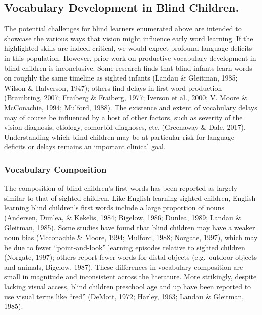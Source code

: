 \documentclass[
  man,floatsintext]{apa6}
\begin{document}
\hypertarget{vocabulary-development-in-blind-children.}{%
\subsection{Vocabulary Development in Blind Children.}\label{vocabulary-development-in-blind-children.}}

The potential challenges for blind learners enumerated above are intended to showcase the various ways that vision might influence early word learning. If the highlighted skills are indeed critical, we would expect profound language deficits in this population. However, prior work on productive vocabulary development in blind children is inconclusive. Some research finds that blind infants learn words on roughly the same timeline as sighted infants (Landau \& Gleitman, 1985; Wilson \& Halverson, 1947); others find delays in first-word production (Brambring, 2007; Fraiberg \& Fraiberg, 1977; Iverson et al., 2000; V. Moore \& McConachie, 1994; Mulford, 1988). The existence and extent of vocabulary delays may of course be influenced by a host of other factors, such as severity of the vision diagnosis, etiology, comorbid diagnoses, etc. (Greenaway \& Dale, 2017). Understanding which blind children may be at particular risk for language deficits or delays remains an important clinical goal.

\hypertarget{vocabulary-composition}{%
\subsubsection{Vocabulary Composition}\label{vocabulary-composition}}

The composition of blind children's first words has been reported as largely similar to that of sighted children. Like English-learning sighted children, English-learning blind children's first words include a large proportion of nouns (Andersen, Dunlea, \& Kekelis, 1984; Bigelow, 1986; Dunlea, 1989; Landau \& Gleitman, 1985). Some studies have found that blind children may have a weaker noun bias (Mcconachie \& Moore, 1994; Mulford, 1988; Norgate, 1997), which may be due to fewer ``point-and-look'' learning episodes relative to sighted children (Norgate, 1997); others report fewer words for distal objects (e.g.~outdoor objects and animals, Bigelow, 1987). These differences in vocabulary composition are small in magnitude and inconsistent across the literature. More strikingly, despite lacking visual access, blind children preschool age and up have been reported to use visual terms like ``red'' (DeMott, 1972; Harley, 1963; Landau \& Gleitman, 1985).
\end{document}

